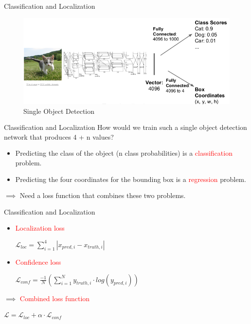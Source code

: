 \documentclass[aspectratio=169]{beamer}
\begin{document}
\begin{frame}{Classification and Localization}
\begin{figure}
    \centering
    \includegraphics[scale=0.4]{demo/figs/object.png}
    \caption{Single Object Detection}
\end{figure}
\end{frame}

\begin{frame}{Classification and Localization}
How would we train such a single object detection network that produces 4 + n values?
\begin{itemize}
    \item Predicting the class of the object (n class probabilities) is a \textcolor{red}{classification} problem.
    \item Predicting the four coordinates for the bounding box is a \textcolor{red}{regression} problem.
\end{itemize}
$\implies$ Need a loss function that combines these two problems.
\end{frame}

\begin{frame}{Classification and Localization}
\begin{itemize}
    \item \textcolor{red}{Localization loss}
    
    $\mathcal{L}_{loc} = \sum_{i = 1}^{4}\left | x_{pred, i} - x_{truth, i} \right |$
    
    \item \textcolor{red}{Confidence loss}
    
    $\mathcal{L}_{conf} = \frac{-1}{N} (\sum_{i = 1}^{N} y_{truth, i} \cdot log(y_{pred, i}))$
    
\end{itemize}
$\implies$ \textcolor{red}{Combined loss function}

\centering

$\mathcal{L} = \mathcal{L}_{loc} + \alpha \cdot \mathcal{L}_{conf}$

\end{frame}
\end{document}
